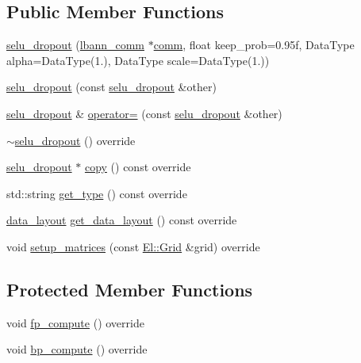 \subsection*{Public Member Functions}
\begin{DoxyCompactItemize}
\item 
\hyperlink{classlbann_1_1selu__dropout_a988a7e6b7b85ef8ba08a2bc52537e6d3}{selu\+\_\+dropout} (\hyperlink{classlbann_1_1lbann__comm}{lbann\+\_\+comm} $\ast$\hyperlink{file__io_8cpp_ab048c6f9fcbcfaa57ce68b00263dbebe}{comm}, float keep\+\_\+prob=0.\+95f, Data\+Type alpha=\+Data\+Type(1.), Data\+Type scale=\+Data\+Type(1.))
\item 
\hyperlink{classlbann_1_1selu__dropout_ae8e81800cf4c75bcf449e192988832b5}{selu\+\_\+dropout} (const \hyperlink{classlbann_1_1selu__dropout}{selu\+\_\+dropout} \&other)
\item 
\hyperlink{classlbann_1_1selu__dropout}{selu\+\_\+dropout} \& \hyperlink{classlbann_1_1selu__dropout_aa4563c71596c91bb568a6808d38e8758}{operator=} (const \hyperlink{classlbann_1_1selu__dropout}{selu\+\_\+dropout} \&other)
\item 
\hyperlink{classlbann_1_1selu__dropout_af3cb2d8724ebca49934769be70e40b83}{$\sim$selu\+\_\+dropout} () override
\item 
\hyperlink{classlbann_1_1selu__dropout}{selu\+\_\+dropout} $\ast$ \hyperlink{classlbann_1_1selu__dropout_a58659790298874e1dc15a45b3199db91}{copy} () const override
\item 
std\+::string \hyperlink{classlbann_1_1selu__dropout_a983e7bf62f995a1fe24363f7b1ff0182}{get\+\_\+type} () const override
\item 
\hyperlink{base_8hpp_a786677cbfb3f5677b4d84f3056eb08db}{data\+\_\+layout} \hyperlink{classlbann_1_1selu__dropout_ae33633add903276c87f725facf0dcd0c}{get\+\_\+data\+\_\+layout} () const override
\item 
void \hyperlink{classlbann_1_1selu__dropout_a8b6469a14cf093d48e42384aa4ee404a}{setup\+\_\+matrices} (const \hyperlink{base_8hpp_a9951bb1719d534e0401b1f06cad19eab}{El\+::\+Grid} \&grid) override
\end{DoxyCompactItemize}
\subsection*{Protected Member Functions}
\begin{DoxyCompactItemize}
\item 
void \hyperlink{classlbann_1_1selu__dropout_a50ccce3672873a12ae69cc76c91e767a}{fp\+\_\+compute} () override
\item 
void \hyperlink{classlbann_1_1selu__dropout_afc80277386fef53296368579876bdb55}{bp\+\_\+compute} () override
\end{DoxyCompactItemize}
